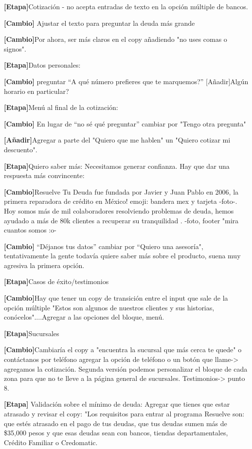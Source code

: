 \textbf{[Etapa]}Cotización - no acepta entradas de texto en la opción múltiple de bancos.

\textbf{[Cambio]} Ajustar el texto para preguntar la deuda más grande

\textbf{[Cambio]}Por ahora, ser más claros en el copy añadiendo "no uses comas o signos".

\textbf{[Etapa]}Datos personales:

\textbf{[Cambio]} preguntar “A qué número prefieres que te marquemos?”
[Añadir]Algún horario en particular?

\textbf{[Etapa]}Menú al final de la cotización: 

\textbf{[Cambio]} En lugar de “no sé qué preguntar” cambiar por "Tengo otra pregunta"

\textbf{[Añadir]}Agregar a parte del "Quiero que me hablen" un "Quiero cotizar mi descuento".

\textbf{[Etapa]}Quiero saber más: Necesitamos generar confianza. Hay que dar una respuesta más  convincente: 

\textbf{[Cambio]}Resuelve Tu Deuda fue fundada por Javier y Juan Pablo en 2006, la primera reparadora de crédito en México! emoji: bandera mex y tarjeta -foto-. Hoy somos más de mil colaboradores resolviendo problemas de deuda, hemos ayudado a más de 80k clientes a recuperar su tranquilidad . -foto, footer "mira cuantos somos :o-

\textbf{[Cambio]} “Déjanos tus datos” cambiar por “Quiero una asesoría", tentativamente la gente todavía quiere saber más sobre el producto, suena muy agresiva la primera opción. 

\textbf{[Etapa]}Casos de éxito/testimonios

\textbf{[Cambio]}Hay que tener un copy de transición entre el input que sale de la opción múltiple "Estos son algunos de nuestros clientes y sus historias, conócelos"....Agregar a las opciones del bloque, menú.  

\textbf{[Etapa]}Sucursales

\textbf{[Cambio]}Cambiaría el copy a "encuentra la sucursal que más cerca te quede" o contáctanos por teléfono agregar la opción de teléfono o un botón que llame-> agregamos la cotización. Segunda versión podemos personalizar el bloque de cada zona para que no te lleve a la página general de sucursales. 
Testimonios-> punto 8.

\textbf{[Etapa]} Validación sobre el mínimo de deuda:
Agregar que tienes que estar atrasado y revisar el copy: "Los requisitos para entrar al programa Resuelve son: que estés atrasado en el pago de tus deudas, que tus deudas sumen más de \$35,000 pesos y que esas deudas sean con bancos, tiendas departamentales, Crédito Familiar o Credomatic.

